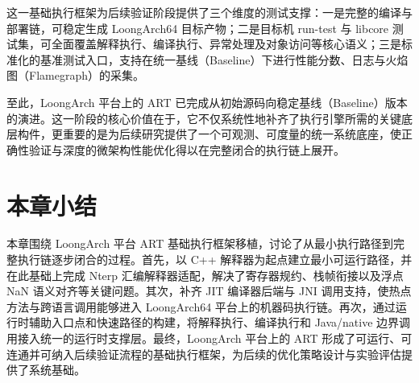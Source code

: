 这一基础执行框架为后续验证阶段提供了三个维度的测试支撑：一是完整的编译与部署链，可稳定生成 LoongArch64 目标产物；二是目标机 run-test 与 libcore 测试集，可全面覆盖解释执行、编译执行、异常处理及对象访问等核心语义；三是标准化的基准测试入口，支持在统一基线（Baseline）下进行性能分数、日志与火焰图（Flamegraph）的采集。

至此，LoongArch 平台上的 ART 已完成从初始源码向稳定基线（Baseline）版本的演进。这一阶段的核心价值在于，它不仅系统性地补齐了执行引擎所需的关键底层构件，更重要的是为后续研究提供了一个可观测、可度量的统一系统底座，使正确性验证与深度的微架构性能优化得以在完整闭合的执行链上展开。

\section{本章小结}

本章围绕 LoongArch 平台 ART 基础执行框架移植，讨论了从最小执行路径到完整执行链逐步闭合的过程。首先，以 C++ 解释器为起点建立最小可运行路径，并在此基础上完成 Nterp 汇编解释器适配，解决了寄存器规约、栈帧衔接以及浮点 NaN 语义对齐等关键问题。其次，补齐 JIT 编译器后端与 JNI 调用支持，使热点方法与跨语言调用能够进入 LoongArch64 平台上的机器码执行链。再次，通过运行时辅助入口点和快速路径的构建，将解释执行、编译执行和 Java/native 边界调用接入统一的运行时支撑层。最终，LoongArch 平台上的 ART 形成了可运行、可连通并可纳入后续验证流程的基础执行框架，为后续的优化策略设计与实验评估提供了系统基础。
